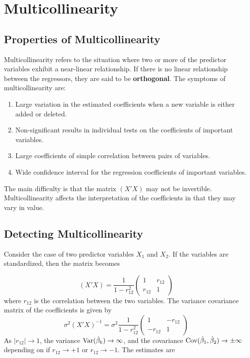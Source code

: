 \chapter{Multicollinearity}

\section{Properties of Multicollinearity}
Multicollinearity refers to the situation where two or more of the predictor variables exhibit a near-linear relationship. If there is no linear relationship between the regressors, they are said to be \textbf{orthogonal}. The symptoms of multicollinearity are:

\begin{enumerate}
    \item Large variation in the estimated coefficients when a new variable is either added or deleted.
    \item Non-significant results in individual tests on the coefficients of important variables.
    \item Large coefficients of simple correlation between pairs of variables. 
    \item Wide confidence interval for the regression coefficients of important variables.
\end{enumerate}

The main difficulty is that the matrix $(X'X)$ may not be invertible. Multicollinearity affects the interpretation of the coefficients in that they may vary in value. 

\section{Detecting Multicollinearity}
Consider the case of two predictor variables $X_1$ and $X_2$. If the variables are standardized, then the matrix becomes 

\[(X'X) = \frac{1}{1-r_{12}^2}\begin{pmatrix}
    1 & r_{12} \\
    r_{12} & 1
\end{pmatrix}\]
where $r_{12}$ is the correlation between the two variables. The variance covariance matrix of the coefficients is given by
\[\sigma^2(X'X)^{-1} = \sigma^2 \frac{1}{1-r_{12}^2}\begin{pmatrix}
    1 & -r_{12} \\
    -r_{12} & 1
\end{pmatrix}\]
As $|r_{12}| \rightarrow 1$, the variance $\operatorname{Var}(\hat{\beta}_k) \rightarrow \infty$, and the covariance $\operatorname{Cov}(\hat{\beta}_1, \hat{\beta}_2) \rightarrow \pm \infty$ depending on if $r_{12} \rightarrow +1$ or $r_{12} \rightarrow -1$. The estimates are 

